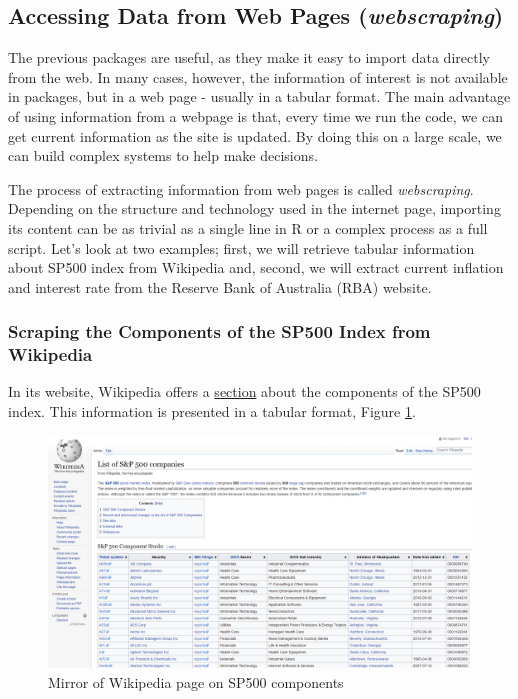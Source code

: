 \documentclass[11pt,]{book}
\begin{document}
\subsection{\texorpdfstring{Accessing Data from Web Pages
(\emph{webscraping})}{Accessing Data from Web Pages (webscraping)}}\label{accessing-data-from-web-pages-webscraping}

The previous packages are useful, as they make it easy to import data
directly from the web. In many cases, however, the information of
interest is not available in packages, but in a web page - usually in a
tabular format. The main advantage of using information from a webpage
is that, every time we run the code, we can get current information as
the site is updated. By doing this on a large scale, we can build
complex systems to help make decisions.

The process of extracting information from web pages is called
\emph{webscraping}. Depending on the structure and technology used in
the internet page, importing its content can be as trivial as a single
line in R or a complex process as a full script. Let's look at two
examples; first, we will retrieve tabular information about SP500 index
from Wikipedia and, second, we will extract current inflation and
interest rate from the Reserve Bank of Australia (RBA) website.

\subsubsection{Scraping the Components of the SP500 Index from
Wikipedia}\label{scraping-the-components-of-the-sp500-index-from-wikipedia}

In its website, Wikipedia offers a
\href{https://en.wikipedia.org/wiki/List_of_S\%26P_500_companies}{section}
about the components of the SP500 index. This information is presented
in a tabular format, Figure \ref{fig:SP500-wikipedia}.

\begin{figure}[!htbp]

{\centering \includegraphics[width=0.75\linewidth]{figs/SP500-Wikipedia} 

}

\caption{Mirror of Wikipedia page on SP500 components}\label{fig:SP500-wikipedia}
\end{figure}
\end{document}
